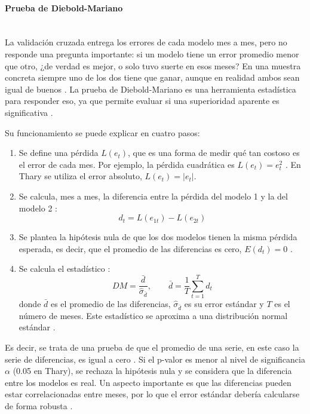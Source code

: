 \paragraph{Prueba de Diebold-Mariano}\mbox{}\\
La validación cruzada entrega los errores de cada modelo mes a mes, pero no responde una pregunta importante: si un modelo tiene un error promedio menor que otro, ¿de verdad es mejor, o solo tuvo suerte en esos meses? En una muestra concreta siempre uno de los dos tiene que ganar, aunque en realidad ambos sean igual de buenos \cite{diebold2015comparing}. La prueba de Diebold-Mariano \cite{diebold_mariano} es una herramienta estadística para responder eso, ya que permite evaluar si una superioridad aparente es significativa \cite{diebold2015comparing}.

Su funcionamiento se puede explicar en cuatro pasos:

\begin{enumerate}
    \item Se define una pérdida $L(e_t)$, que es una forma de medir qué tan costoso es el error de cada mes. Por ejemplo, la pérdida cuadrática es $L(e_t) = e_t^2$ \cite{diebold2015comparing}. En Thary se utiliza el error absoluto, $L(e_t) = |e_t|$.
    \item Se calcula, mes a mes, la diferencia entre la pérdida del modelo 1 y la del modelo 2 \cite{diebold2015comparing}:
    \begin{equation}
    d_t = L(e_{1t}) - L(e_{2t})
    \end{equation}
    \item Se plantea la hipótesis nula de que los dos modelos tienen la misma pérdida esperada, es decir, que el promedio de las diferencias es cero, $E(d_t) = 0$ \cite{diebold2015comparing}.
    \item Se calcula el estadístico \cite{diebold2015comparing}:
    \begin{equation}
    DM = \frac{\bar{d}}{\hat{\sigma}_{\bar{d}}}, \qquad \bar{d} = \frac{1}{T}\sum_{t=1}^{T} d_t
    \end{equation}
    donde $\bar{d}$ es el promedio de las diferencias, $\hat{\sigma}_{\bar{d}}$ es su error estándar y $T$ es el número de meses. Este estadístico se aproxima a una distribución normal estándar \cite{diebold2015comparing}.
\end{enumerate}

Es decir, se trata de una prueba de que el promedio de una serie, en este caso la serie de diferencias, es igual a cero \cite{diebold2015comparing}. Si el p-valor es menor al nivel de significancia $\alpha$ (0.05 en Thary), se rechaza la hipótesis nula y se considera que la diferencia entre los modelos es real. Un aspecto importante es que las diferencias pueden estar correlacionadas entre meses, por lo que el error estándar debería calcularse de forma robusta \cite{diebold2015comparing}.


